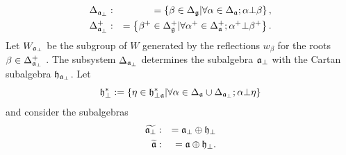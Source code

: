 \documentclass[12pt]{iopart}
\theoremstyle{definition}
\begin{document}
\begin{eqnarray*}
\Delta _{\frak{a}_{\perp }} &:&=\left\{ \beta \in \Delta _{\frak{g}}|\forall
\alpha \in \Delta _{\frak{a}};\alpha \bot \beta \right\} , \\
\Delta _{\frak{a}_{\perp }}^{+} &:&=\left\{ \beta ^{+}\in \Delta _{\frak{g}%
}^{+}|\forall \alpha ^{+}\in \Delta _{\frak{a}}^{+};\alpha ^{+}\bot \beta
^{+}\right\} .
\end{eqnarray*}
Let $W_{\frak{a}_{\perp }}$ be the subgroup of $W$ generated by the
reflections $w _{\beta }$ for the roots $\beta \in \Delta _{\frak{a}%
_{\perp }}^{+}$ . The subsystem $\Delta _{\frak{a}_{\perp }}$ determines the
subalgebra $\frak{a}_{\perp }$ with the Cartan subalgebra $\frak{h}_{\frak{a}%
_{\perp }}$. Let
\begin{equation*}
\frak{h}_{\perp }^{\ast }:=\left\{ \eta \in \frak{h}_{\perp \frak{a}}^{\ast
}|\forall \alpha \in \Delta _{\frak{a}}\cup \Delta _{\frak{a}_{\perp
}};\alpha \bot \eta \right\}
\end{equation*}
and consider the subalgebras
\begin{eqnarray*}
\widetilde{\frak{a}_{\perp }} &:&=\frak{a}_{\perp }\oplus \frak{h}_{\perp }
\\
\widetilde{\frak{a}} &:&=\frak{a}\oplus \frak{h}_{\perp }.
\end{eqnarray*}
\end{document}
